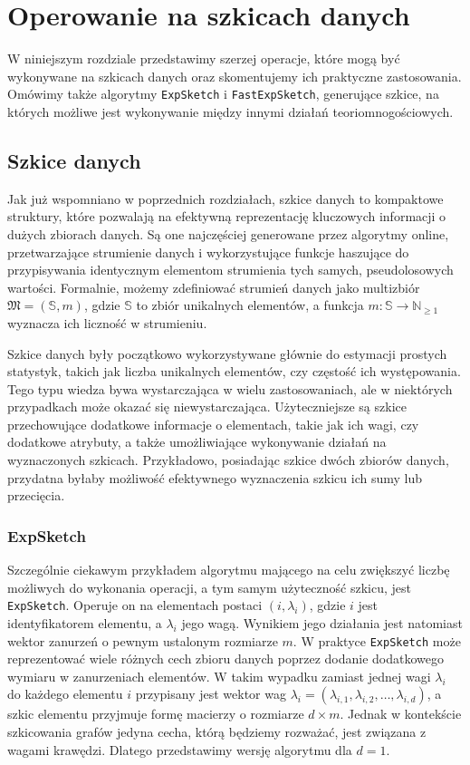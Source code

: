 \chapter{Operowanie na szkicach danych}
W niniejszym rozdziale przedstawimy szerzej operacje, które mogą być wykonywane na szkicach danych oraz skomentujemy ich praktyczne zastosowania. Omówimy także algorytmy \texttt{ExpSketch} i \texttt{FastExpSketch}, generujące szkice, na których możliwe jest wykonywanie między innymi działań teoriomnogościowych.

\section{Szkice danych}
    Jak już wspomniano w poprzednich rozdziałach, szkice danych to kompaktowe struktury, które pozwalają na efektywną reprezentację kluczowych informacji o dużych zbiorach danych. Są one najczęściej generowane przez algorytmy online, przetwarzające strumienie danych i wykorzystujące funkcje haszujące do przypisywania identycznym elementom strumienia tych samych, pseudolosowych wartości. Formalnie, możemy zdefiniować strumień danych jako multizbiór $\mathfrak{M} = (\mathbb{S},m)$, gdzie $\mathbb{S}$ to zbiór unikalnych elementów, a funkcja $m : \mathbb{S} \rightarrow \mathbb{N}_{\geq 1}$ wyznacza ich liczność w strumieniu.

    Szkice danych były początkowo wykorzystywane głównie do estymacji prostych statystyk, takich jak liczba unikalnych elementów, czy częstość ich występowania. Tego typu wiedza bywa wystarczająca w wielu zastosowaniach, ale w niektórych przypadkach może okazać się niewystarczająca. Użyteczniejsze są szkice przechowujące dodatkowe informacje o elementach, takie jak ich wagi, czy dodatkowe atrybuty, a także umożliwiające wykonywanie działań na wyznaczonych szkicach. Przykładowo, posiadając szkice dwóch zbiorów danych, przydatna byłaby możliwość efektywnego wyznaczenia szkicu ich sumy lub przecięcia.  

\subsection{ExpSketch}
    Szczególnie ciekawym przykładem algorytmu mającego na celu zwiększyć liczbę możliwych do wykonania operacji, a tym samym użyteczność szkicu, jest \texttt{ExpSketch}\cite{Lemiesz_2021}. Operuje on na elementach postaci $(i, \lambda_{i})$, gdzie $i$ jest identyfikatorem elementu, a $\lambda_{i}$ jego wagą. Wynikiem jego działania jest natomiast wektor zanurzeń o pewnym ustalonym rozmiarze $m$. W praktyce \texttt{ExpSketch} może reprezentować wiele różnych cech zbioru danych poprzez dodanie dodatkowego wymiaru w zanurzeniach elementów. W takim wypadku zamiast jednej wagi $\lambda_i$ do każdego elementu $i$ przypisany jest wektor wag $\lambda_i = (\lambda_{i,1}, \lambda_{i,2}, \dots, \lambda_{i,d})$, a szkic elementu przyjmuje formę macierzy o rozmiarze $d \times m$. Jednak w kontekście szkicowania grafów jedyna cecha, którą będziemy rozważać, jest związana z wagami krawędzi. Dlatego przedstawimy wersję algorytmu dla $d = 1$.

